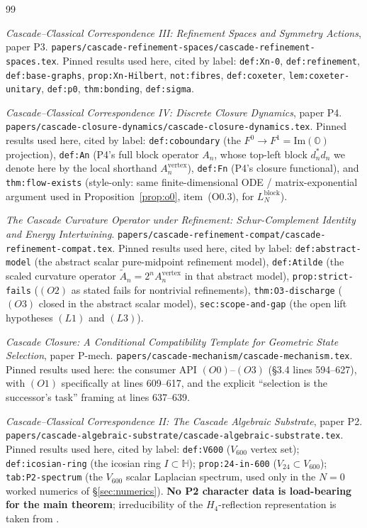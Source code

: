 \documentclass[11pt]{article}
\newcommand{\HH}{\mathbb{H}}
\newcommand{\OO}{\mathbb{O}}
\theoremstyle{definition}
\begin{document}
\begin{thebibliography}{99}

\emph{Cascade--Classical Correspondence III: Refinement Spaces and
Symmetry Actions}, paper P3.
\texttt{papers/cascade-refinement-spaces/cascade-refinement-spaces.tex}.
Pinned results used here, cited by label:
\texttt{def:Xn-0}, \texttt{def:refinement}, \texttt{def:base-graphs},
\texttt{prop:Xn-Hilbert}, \texttt{not:fibres},
\texttt{def:coxeter}, \texttt{lem:coxeter-unitary},
\texttt{def:p0}, \texttt{thm:bonding}, \texttt{def:sigma}.

\emph{Cascade--Classical Correspondence IV: Discrete Closure
Dynamics}, paper P4.
\texttt{papers/cascade-closure-dynamics/cascade-closure-dynamics.tex}.
Pinned results used here, cited by label:
\texttt{def:coboundary} (the $F^0 \to F^1 = \mathrm{Im}(\OO)$
projection), \texttt{def:An} (P4's full block operator $A_n$,
whose top-left block $d_n^{*} d_n$ we denote here by the local
shorthand $A_n^{\mathrm{vertex}}$),
\texttt{def:Fn} (P4's closure functional), and
\texttt{thm:flow-exists} (style-only: same finite-dimensional ODE /
matrix-exponential argument used in
Proposition~\ref{prop:o0}, item~(O0.3), for
$L_N^{\mathrm{block}}$).

\emph{The Cascade Curvature Operator under Refinement:
Schur-Complement Identity and Energy Intertwining}.
\texttt{papers/cascade-refinement-compat/cascade-refinement-compat.tex}.
Pinned results used here, cited by label:
\texttt{def:abstract-model} (the abstract scalar pure-midpoint
refinement model), \texttt{def:Atilde} (the scaled curvature
operator $\widetilde A_n = 2^n A_n^{\mathrm{vertex}}$ in that
abstract model), \texttt{prop:strict-fails} ($(O2)$ as stated
fails for nontrivial refinements),
\texttt{thm:O3-discharge} ($(O3)$ closed in the abstract scalar
model), \texttt{sec:scope-and-gap} (the open lift hypotheses
$(L1)$ and $(L3)$).

\emph{Cascade Closure: A Conditional Compatibility Template for
Geometric State Selection}, paper P-mech.
\texttt{papers/cascade-mechanism/cascade-mechanism.tex}.
Pinned results used here: the consumer API $(O0)$--$(O3)$
(\S 3.4 lines 594--627), with $(O1)$ specifically at lines
609--617, and the explicit ``selection is the successor's task''
framing at lines 637--639.

\emph{Cascade--Classical Correspondence II: The Cascade Algebraic
Substrate}, paper P2.
\texttt{papers/cascade-algebraic-substrate/cascade-algebraic-substrate.tex}.
Pinned results used here, cited by label:
\texttt{def:V600} ($V_{600}$ vertex set);
\texttt{def:icosian-ring} (the icosian ring $I \subset \HH$);
\texttt{prop:24-in-600} ($V_{24} \subset V_{600}$);
\texttt{tab:P2-spectrum} (the $V_{600}$ scalar Laplacian
spectrum, used only in the $N = 0$ worked numerics of
\S\ref{sec:numerics}). \textbf{No P2 character data is
load-bearing for the main theorem}; irreducibility of the
$H_4$-reflection representation is taken from \cite{Humphreys}.


\end{thebibliography}
\end{document}
